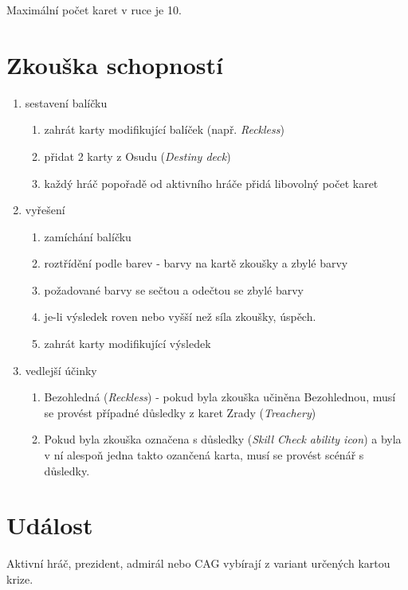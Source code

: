 \documentclass[a4paper,twocolumn]{article}
\begin{document}
Maximální počet karet v ruce je 10.\\

\section{Zkouška schopností}
\begin{enumerate}
\item sestavení balíčku
	\begin{enumerate}
 	\item zahrát karty modifikující balíček (např. \emph{Reckless})
	\item přidat 2 karty z Osudu (\emph{Destiny deck})
	\item každý hráč popořadě od aktivního hráče přidá libovolný počet karet
	\end{enumerate}
\item vyřešení 
	\begin{enumerate}
	\item zamíchání balíčku
	\item roztřídění podle barev - barvy na kartě zkoušky a zbylé barvy
	\item požadované barvy se sečtou a odečtou se zbylé barvy
	\item je-li výsledek roven nebo vyšší než síla zkoušky, úspěch.
	\item zahrát karty modifikující výsledek
	\end{enumerate}
\item vedlejší účinky
	\begin{enumerate}
	\item Bezohledná (\emph{Reckless}) - pokud byla zkouška učiněna Bezohlednou, musí se provést případné důsledky z karet Zrady (\emph{Treachery})
	\item Pokud byla zkouška označena s důsledky (\emph{Skill Check ability icon}) a byla v ní alespoň jedna takto ozančená karta, musí se provést scénář s důsledky.
	\end{enumerate}
\end{enumerate}

\section{Událost}
Aktivní hráč, prezident, admirál nebo CAG vybírají z variant určených kartou krize.
\end{document}
